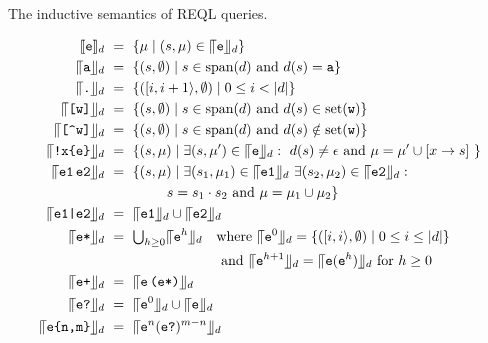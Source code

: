 \begin{table}
	\caption{The inductive semantics of REQL queries.}
	\begin{align*}
		\llbracket\texttt{e}\rrbracket_{d} & \ = \  \{ \mu \mid (s, \mu) \in \llceil{\texttt{e}}\rrfloor_{d} \}\\
		\llceil{\texttt{a}}\rrfloor_{d} & \ = \  \{ (s, \emptyset) \mid s \in \text{span}(d) \text{ and } d(s) = \texttt{a} \}\\
		\llceil{\texttt{.}}\rrfloor_{d} & \ = \  \{ ([i,i+1\rangle, \emptyset) \mid 0 \leq i < |d| \}\\
		\llceil{\texttt{[w]}}\rrfloor_{d} & \ = \  \{ (s, \emptyset) \mid s \in \text{span}(d) \text{ and } d(s) \in  \text{set}(\texttt{w}) \}\\
		\llceil{\texttt{[\textasciicircum w]}}\rrfloor_{d} & \ = \  \{ (s, \emptyset) \mid s \in \text{span}(d) \text{ and } d(s) \notin  \text{set}(\texttt{w}) \}\\
		\llceil{\texttt{!x\{e\}}}\rrfloor_{d} & \ = \  \{ (s, \mu) \mid \exists (s, \mu') \in \llceil{\texttt{e}}\rrfloor_{d}: \ d(s) \neq \epsilon \text{ and }
		\mu =  \mu'  \cup [x \to s] \ \} \\
		\llceil{\texttt{e1} \, \texttt{e2}}\rrfloor_{d} & \ = \  \{ (s, \mu) \mid
		\exists (s_1, \mu_1) \in \llceil{\texttt{e1}}\rrfloor_{d} \ \exists (s_2, \mu_2) \in \llceil{\texttt{e2}}\rrfloor_{d}: \\
		& \;\;\;\;\;\;\;\;\;\;\;\;\;\;\;\; s = s_1 \cdot s_2 \text{ and } \mu = \mu_1 \cup \mu_2 \}\\
		\llceil{\texttt{e1|e2}}\rrfloor_{d} & \ = \  \llceil{\texttt{e1}}\rrfloor_{d} \cup \llceil{\texttt{e2}}\rrfloor_{d}\\
		\llceil{\texttt{e*}}\rrfloor_{d} & \ = \  {\textstyle\bigcup}_{h\geq 0}\llceil{\texttt{e}^h}\rrfloor_{d} \quad \text{where } \llceil{\texttt{e}^0}\rrfloor_{d} = \{([i,i\rangle, \emptyset) \mid 0 \leq i \leq |d|\}\ \\
		& \qquad\qquad\qquad\qquad \text{ and } \llceil{\texttt{e}^{h+1}}\rrfloor_{d} = \llceil{\texttt{e}(\texttt{e}^h)}\rrfloor_{d} \text{ for } h \geq 0 \\
		\llceil{\texttt{e+}}\rrfloor_{d} & \ = \  \llceil{\texttt{e}\, \texttt{(e*)}}\rrfloor_{d} \\
		\llceil{\texttt{e?}}\rrfloor_{d} & \ = \  \llceil{\texttt{e}^0}\rrfloor_{d} \cup \llceil{\texttt{e}}\rrfloor_{d} \\
		\llceil{\texttt{e\{n,m\}}}\rrfloor_{d} & \ = \  \llceil{\texttt{e}^n(\texttt{e?})^{m-n}}\rrfloor_{d}
	\end{align*}
	\label{tab-semantics}	
\end{table}

